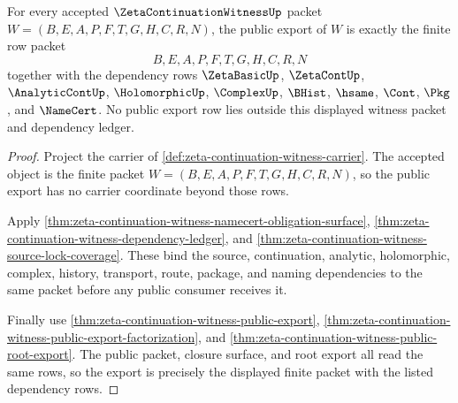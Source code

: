 \begin{theorem}
\label{thm:zeta-continuation-witness-public-export-lock}
For every accepted $\ZetaContinuationWitnessUp$ packet $W=(B,E,A,P,F,T,G,H,C,R,N)$, the public export of $W$ is exactly the finite row packet
$$
B,E,A,P,F,T,G,H,C,R,N
$$
together with the dependency rows $\ZetaBasicUp$, $\ZetaContUp$, $\AnalyticContUp$, $\HolomorphicUp$, $\ComplexUp$, $\BHist$, $\hsame$, $\Cont$, $\Pkg$, and $\NameCert$. No public export row lies outside this displayed witness packet and dependency ledger.
\end{theorem}
\begin{proof}
Project the carrier of \autoref{def:zeta-continuation-witness-carrier}. The accepted object is the finite packet $W=(B,E,A,P,F,T,G,H,C,R,N)$, so the public export has no carrier coordinate beyond those rows.

Apply \autoref{thm:zeta-continuation-witness-namecert-obligation-surface}, \autoref{thm:zeta-continuation-witness-dependency-ledger}, and \autoref{thm:zeta-continuation-witness-source-lock-coverage}. These bind the source, continuation, analytic, holomorphic, complex, history, transport, route, package, and naming dependencies to the same packet before any public consumer receives it.

Finally use \autoref{thm:zeta-continuation-witness-public-export}, \autoref{thm:zeta-continuation-witness-public-export-factorization}, and \autoref{thm:zeta-continuation-witness-public-root-export}. The public packet, closure surface, and root export all read the same rows, so the export is precisely the displayed finite packet with the listed dependency rows.
\end{proof}

